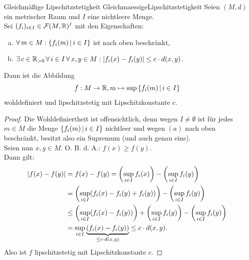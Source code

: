\begin{lemma}{Gleichmäßige Lipschitzstetigkeit}
             {GleichmaessigeLipschitzstetigkeit}
Seien $(M,d)$ ein metrischer Raum und $I$ eine nichtleere Menge.\\
Sei $(f_i)_{i \in I} \in \mathcal{F}(M, \mathbb{R})^I$ mit den Eigenschaften:
\begin{enumerate}[(a)]
\item $\forall\, m \in M: \left\{f_i(m)\,|\,i \in I\right\}$ ist nach oben beschränkt,
\item $\exists\, c \in \mathbb{R}_{>0}\,\forall\, i \in I \, \forall\, x, y \in M:
\left|f_i(x)-f_i(y)\right|\le c\cdot d(x, y)$.
\end{enumerate}
Dann ist die Abbildung
\[f: M \rightarrow \mathbb{R}, m \mapsto \sup\left\{f_i(m)\,|\,i \in I\right\}\]
wohldefiniert und lipschitzstetig mit Lipschitzkonstante $c$.
\end{lemma}
\begin{proof}
Die Wohldefiniertheit ist offensichtlich, denn wegen $I \neq \emptyset$ ist
für jedes $m \in M$ die Menge $\left\{f_i(m)\,|\,i \in I\right\}$ nichtleer und wegen
$(a)$ nach oben beschränkt, besitzt also ein Supremum (und auch genau eins).\\
Seien nun $x, y \in M$. O. B. d. A.: $f(x) \ge f(y)$.\\
Dann gilt:
\begin{align*}
\left|f(x)-f(y)\right| &= f(x) - f(y) = \left(\sup_{i \in I}f_i(x)\right) -
 \left(\sup_{i \in I}f_i(y)\right)\\
 & = \left(\sup_{i \in I}(f_i(x)-f_i(y) + f_i(y))\right) -
 \left(\sup_{i \in I}f_i(y)\right)\\
 &\le \left(\sup_{i \in I}(f_i(x) -f_i(y)) \right)
 + \left(\sup_{i\in I}f_i(y)\right) - \left(\sup_{i\in I}f_i(y)\right)\\
 & = \sup_{i \in I}\underbrace{(f_i(x) -f_i(y))}_{\le c\cdot d(x, y)}
 \le c \cdot d(x, y)\text.
\end{align*}
Also ist $f$ lipschitzstetig mit Lipschitzkonstante $c$.
\end{proof}
